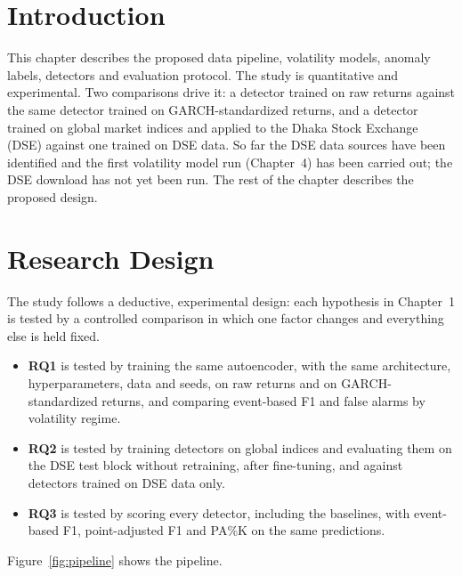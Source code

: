 \label{ch:method}

\section{Introduction}
This chapter describes the proposed data pipeline, volatility models, anomaly labels,
detectors and evaluation protocol. The study is quantitative and experimental. Two
comparisons drive it: a detector trained on raw returns against the same detector trained
on GARCH-standardized returns, and a detector trained on global market indices and applied
to the Dhaka Stock Exchange (DSE) against one trained on DSE data. So far the DSE data
sources have been identified and the first volatility model run (Chapter~4) has been
carried out; the DSE download has not yet been run. The rest of the chapter describes the
proposed design.

\section{Research Design}
The study follows a deductive, experimental design: each hypothesis in Chapter~1 is
tested by a controlled comparison in which one factor changes and everything else is held
fixed.

\begin{itemize}
    \item \textbf{RQ1} is tested by training the same autoencoder, with the same
    architecture, hyperparameters, data and seeds, on raw returns and on GARCH-standardized
    returns, and comparing event-based F1 and false alarms by volatility regime.
    \item \textbf{RQ2} is tested by training detectors on global indices and evaluating them
    on the DSE test block without retraining, after fine-tuning, and against detectors
    trained on DSE data only.
    \item \textbf{RQ3} is tested by scoring every detector, including the baselines, with
    event-based F1, point-adjusted F1 and PA\%K on the same predictions.
\end{itemize}

Figure~\ref{fig:pipeline} shows the pipeline.

